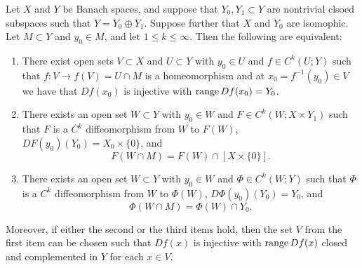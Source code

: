 \documentclass[a4paper]{article}
\begin{document}
\begin{thm}
Let $X$ and $Y$ be Banach spaces, and suppose that
$Y_0, Y_1 \subset Y$ are nontrivial clsoed subspaces
such that $Y = Y_0 \oplus Y_1$. Suppose further that
$X$ and $Y_0$ are isomophic. Let $M \subset Y$ and
$y_0 \in M$, and let $1 \leq k \leq \infty$. Then the
following are equivalent:
\begin{enumerate}
\item There exist open sets $V \subset X$ and $U \subset Y$
with $y_0 \in U$ and $f \in C^k(U ; Y)$ such that $f :
V \to f(V) = U \cap M$ is a homeomorphism and at $x_0
= f^{-1}(y_0) \in V$ we have that $Df(x_0)$ is injective
with $\operatorname{range} Df(x_0) = Y_0$.

\item There exists an open set $W \subset Y$ with $y_0 \in W$
and $F \in C^k(W ; X \times Y_1)$ such that $F$ is a
$C^k$ diffeomorphism from $W$ to $F(W)$, $DF(y_0)(Y_0)
= X_0 \times \{0\}$, and
\[
F(W \cap M) = F(W) \cap [X \times \{0\}].
\]

\item There exists an open set $W \subset Y$ with $y_0 \in W$
and $\Phi \in C^k(W ; Y)$ such that $\Phi$ is a $C^k$
diffeomorphism from $W$ to $\Phi(W)$, $D \Phi(y_0) (Y_0)
= Y_0$, and
\[
\Phi(W \cap M) = \Phi(W) \cap Y_0.
\]
\end{enumerate}

Moreover, if either the second or the third items hold, then
the set $V$ from the first item can be chosen such that
$Df(x)$ is injective with $\operatorname{range} Df(x)$ closed and
complemented in $Y$ for each $x \in V$.
\end{thm}
\end{document}
